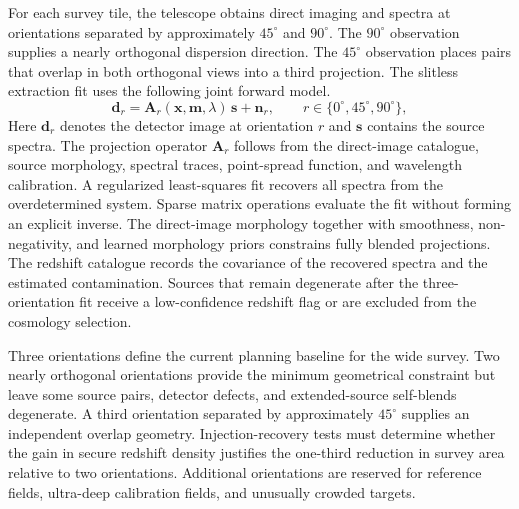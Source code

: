 For each survey tile, the telescope obtains direct imaging and spectra at orientations separated by approximately $45^\circ$ and $90^\circ$. The $90^\circ$ observation supplies a nearly orthogonal dispersion direction. The $45^\circ$ observation places pairs that overlap in both orthogonal views into a third projection. The slitless extraction fit uses the following joint forward model.
\begin{equation}
  \mathbf{d}_{r}=\mathbf{A}_{r}(\mathbf{x},\mathbf{m},\lambda)\,\mathbf{s}+\mathbf{n}_{r},
  \qquad r\in\{0^\circ,45^\circ,90^\circ\},
  \label{eq:scene}
\end{equation} 
Here $\mathbf{d}_{r}$ denotes the detector image at orientation $r$ and $\mathbf{s}$ contains the source spectra. The projection operator $\mathbf{A}_{r}$ follows from the direct-image catalogue, source morphology, spectral traces, point-spread function, and wavelength calibration. A regularized least-squares fit recovers all spectra from the overdetermined system. Sparse matrix operations evaluate the fit without forming an explicit inverse. The direct-image morphology together with smoothness, non-negativity, and learned morphology priors constrains fully blended projections. The redshift catalogue records the covariance of the recovered spectra and the estimated contamination. Sources that remain degenerate after the three-orientation fit receive a low-confidence redshift flag or are excluded from the cosmology selection.

Three orientations define the current planning baseline for the wide survey. Two nearly orthogonal orientations provide the minimum geometrical constraint but leave some source pairs, detector defects, and extended-source self-blends degenerate. A third orientation separated by approximately $45^\circ$ supplies an independent overlap geometry. Injection-recovery tests must determine whether the gain in secure redshift density justifies the one-third reduction in survey area relative to two orientations. Additional orientations are reserved for reference fields, ultra-deep calibration fields, and unusually crowded targets.

